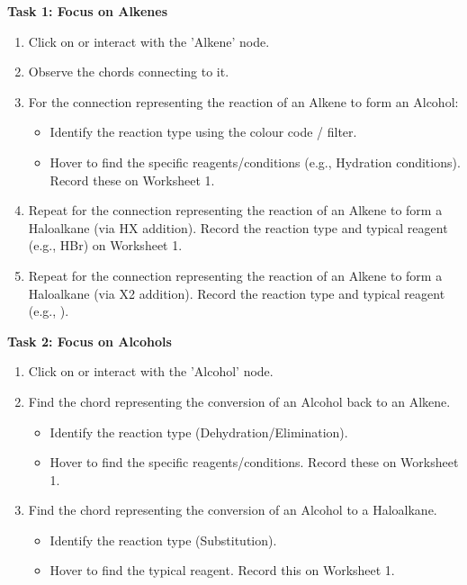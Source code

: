 \documentclass[11pt, a4paper]{article} %
\begin{document}
\textbf{Task 1: Focus on Alkenes}
\begin{enumerate}
    \item Click on or interact with the 'Alkene' node.
    \item Observe the chords connecting to it.
    \item For the connection representing the reaction of an Alkene to form an Alcohol:
        \begin{itemize}
            \item Identify the reaction type using the colour code / filter.
            \item Hover to find the specific reagents/conditions (e.g., Hydration conditions). Record these on Worksheet 1.
        \end{itemize}
    \item Repeat for the connection representing the reaction of an Alkene to form a Haloalkane (via HX addition). Record the reaction type and typical reagent (e.g., HBr) on Worksheet 1.
    \item Repeat for the connection representing the reaction of an Alkene to form a Haloalkane (via X2 addition). Record the reaction type and typical reagent (e.g., ).
\end{enumerate}

\textbf{Task 2: Focus on Alcohols}
\begin{enumerate}
    \item Click on or interact with the 'Alcohol' node.
    \item Find the chord representing the conversion of an Alcohol back to an Alkene.
        \begin{itemize}
            \item Identify the reaction type (Dehydration/Elimination).
            \item Hover to find the specific reagents/conditions. Record these on Worksheet 1.
        \end{itemize}
    \item Find the chord representing the conversion of an Alcohol to a Haloalkane.
        \begin{itemize}
            \item Identify the reaction type (Substitution).
            \item Hover to find the typical reagent. Record this on Worksheet 1.
        \end{itemize}
\end{enumerate}
\end{document}
